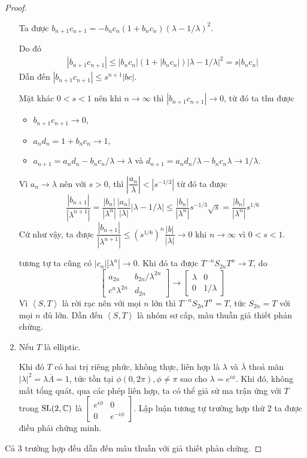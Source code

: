 \begin{proof}
\begin{enumerate}
        Ta được $b_{n+1}c_{n+1} = -b_nc_n(1+b_nc_n)\left(\lambda-1/\lambda\right)^2$.

        Do đó 
        \begin{align*}
            |b_{n+1}c_{n+1}| \leq |b_nc_n|(1+|b_nc_n|)\left|\lambda-1/\lambda\right|^2 = s|b_nc_n|
        \end{align*}
        Dẫn đến $|b_{n+1}c_{n+1}| \leq s^{n+1}|bc|$. 
        
        Mặt khác $0<s<1$ nên khi $n\to \infty$ thì $|b_{n+1}c_{n+1}| \to 0$, từ đó ta thu được
        \begin{itemize}
            \item $b_{n+1}c_{n+1} \to 0$,
            \item $a_nd_n = 1 + b_nc_n \to 1$,
            \item $a_{n+1} = a_nd_n - b_nc_n/\lambda \to \lambda$ và $d_{n+1} = a_nd_n/\lambda - b_nc_n\lambda \to 1/\lambda$.
        \end{itemize}
        Vì $a_n \to \lambda$ nên với $s>0$, thì $\left|\dfrac{a_n}{\lambda}\right|<|s^{-1/3}|$ từ đó ta được
        \[\dfrac{|b_{n+1}|}{|\lambda^{n+1}|} = \dfrac{|b_n|}{|\lambda^n|}\dfrac{|a_n|}{|\lambda|}|\lambda - 1/\lambda|\leq \dfrac{|b_n|}{|\lambda^n|}s^{-1/3}\sqrt{s} = \dfrac{|b_n|}{|\lambda^n|}s^{1/6} \]
        Cứ như vậy, ta được $\dfrac{|b_{n+1}|}{|\lambda^{n+1}|} \leq (s^{1/6})^n \dfrac{|b|}{|\lambda|} \longrightarrow 0$ khi $n \to \infty$ vì $0<s<1$.

        tương tự ta cũng có $|c_n||\lambda^n| \to 0$. Khi đó ta được $T^{-n}S_{2n}T^n \longrightarrow T$, do 
        \[ \begin{bmatrix}
            a_{2n} & b_{2n}/\lambda^{2n}\\
            c^n\lambda^{2n} & d_{2n}
        \end{bmatrix} \longrightarrow \begin{bmatrix}
            \lambda & 0\\
            0 & 1/\lambda
        \end{bmatrix}\]
        Vì $\left<S,T\right>$ là rời rạc nên với mọi $n$ lớn thì $T^{-n}S_{2n}T^{n} = T$, tức $S_{2n} = T$ với mọi $n$ đủ lớn. Dẫn đến $\left<S,T\right>$ là nhóm sơ cấp, mâu thuẫn giả thiết phản chứng.

        \item Nếu $T$ là elliptic.

        Khi đó $T$ có hai trị riêng phức, không thực, liên hợp là $\lambda$ và $\overline{\lambda}$ thoả mãn $|\lambda|^2 = \lambda\overline{\Lambda} =1$, tức tồn tại $\phi (0,2\pi), \phi \neq \pi$ sao cho $\lambda = e^{i\phi}$. Khi đó, không mất tổng quát, qua các phép liên hợp, ta có thể giả sử ma trận ứng với $T$ trong $\operatorname{SL}(2,\mathbb{C})$ là $\begin{bmatrix}
            e^{i\phi} & 0\\
            0 & e^{-i\phi}
        \end{bmatrix}$. Lập luận tương tự trường hợp thứ 2 ta được điều phải chứng minh.
        \end{enumerate}
        Cả 3 trường hợp đều dẫn đến mâu thuẫn với giả thiết phản chứng.
\end{proof}

